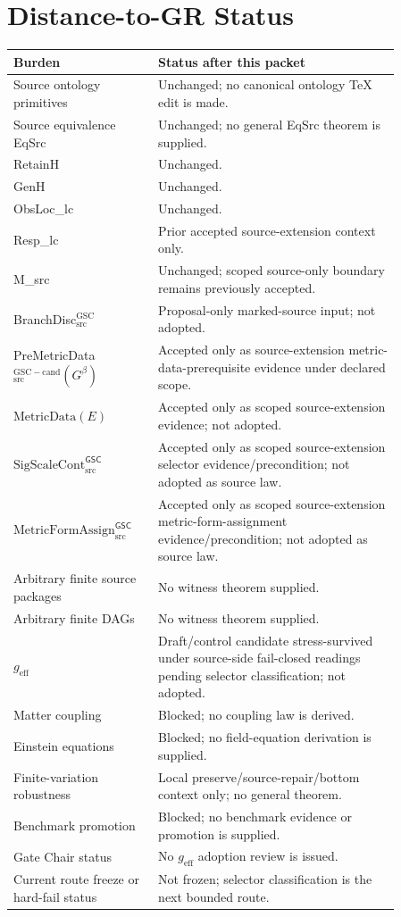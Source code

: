 \documentclass[11pt]{article}
\newcommand{\Gbeta}{G^\beta}
\newcommand{\SigScaleCont}{\mathrm{SigScaleCont}^{\mathsf{GSC}}_{\mathrm{src}}}
\newcommand{\MetricFormAssign}{\mathrm{MetricFormAssign}^{\mathsf{GSC}}_{\mathrm{src}}}
\newcommand{\geff}{g_{\mathrm{eff}}}
\begin{document}
\section{Distance-to-GR Status}

\begin{longtable}{p{0.30\linewidth}p{0.56\linewidth}}
\toprule
Burden & Status after this packet \\
\midrule
Source ontology primitives & Unchanged; no canonical ontology TeX edit is made. \\
Source equivalence EqSrc & Unchanged; no general EqSrc theorem is supplied. \\
RetainH & Unchanged. \\
GenH & Unchanged. \\
ObsLoc\_lc & Unchanged. \\
Resp\_lc & Prior accepted source-extension context only. \\
M\_src & Unchanged; scoped source-only boundary remains previously accepted. \\
BranchDisc\(_{\mathrm{src}}^{\mathrm{GSC}}\) & Proposal-only marked-source input; not adopted. \\
PreMetricData\(_{\mathrm{src}}^{\mathrm{GSC-cand}}(\Gbeta)\) & Accepted only as source-extension metric-data-prerequisite evidence under declared scope. \\
\(\mathrm{MetricData}(E)\) & Accepted only as scoped source-extension evidence; not adopted. \\
\(\SigScaleCont\) & Accepted only as scoped source-extension selector evidence/precondition; not adopted as source law. \\
\(\MetricFormAssign\) & Accepted only as scoped source-extension metric-form-assignment evidence/precondition; not adopted as source law. \\
Arbitrary finite source packages & No witness theorem supplied. \\
Arbitrary finite DAGs & No witness theorem supplied. \\
\(\geff\) & Draft/control candidate stress-survived under source-side fail-closed readings pending selector classification; not adopted. \\
Matter coupling & Blocked; no coupling law is derived. \\
Einstein equations & Blocked; no field-equation derivation is supplied. \\
Finite-variation robustness & Local preserve/source-repair/bottom context only; no general theorem. \\
Benchmark promotion & Blocked; no benchmark evidence or promotion is supplied. \\
Gate Chair status & No \(\geff\) adoption review is issued. \\
Current route freeze or hard-fail status & Not frozen; selector classification is the next bounded route. \\
\bottomrule
\end{longtable}
\end{document}
